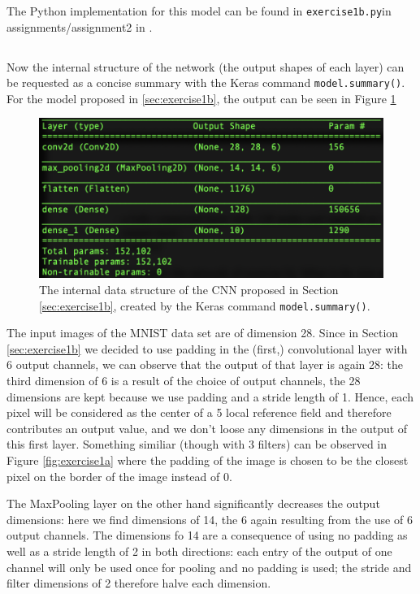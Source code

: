 \documentclass[12pt]{article}
\newcommand{\exerciseoneb}{\texttt{exercise1b.py}\;}
\begin{document}
\noindent The Python implementation for this model can be found in \exerciseoneb in assignments/assignment2 in \cite{JGitHub}. 


\subsection{}\label{sec:exercise1c}
Now the internal structure of the network (the output shapes of each layer) can be requested as a concise summary with the Keras command \texttt{model.summary()}. For the model proposed in \ref{sec:exercise1b}, the output can be seen in Figure \ref{fig:exercise1c}

\begin{figure}[ht]
\centering
   \includegraphics[scale=0.7]{graphics/model1b.png}
    \caption{The internal data structure of the CNN proposed in Section \ref{sec:exercise1b}, created by the Keras command \texttt{model.summary()}.}
    \label{fig:exercise1c}
\end{figure}

The input images of the MNIST data set are of dimension 28. Since in Section \ref{sec:exercise1b} we decided to use padding in the (first,) convolutional layer with 6 output channels, we can observe that the output of that layer is again 28: the third dimension of 6 is a result of the choice of output channels, the 28 dimensions are kept because we use padding and a stride length of 1. Hence, each pixel will be considered as the center of a 5 local reference field and therefore contributes an output value, and we don't loose any dimensions in the output of this first layer. Something similiar (though with 3 filters) can be observed in Figure \ref{fig:exercise1a} where the padding of the image is chosen to be the closest pixel on the border of the image instead of 0. 

The MaxPooling layer on the other hand significantly decreases the output dimensions: here we find dimensions of 14, the 6 again resulting from the use of 6 output channels. The dimensions fo 14 are a consequence of using no padding as well as a stride length of 2 in both directions: each entry of the output of one channel will only be used once for pooling and no padding is used; the stride and filter dimensions of 2 therefore halve each dimension.
\end{document}
